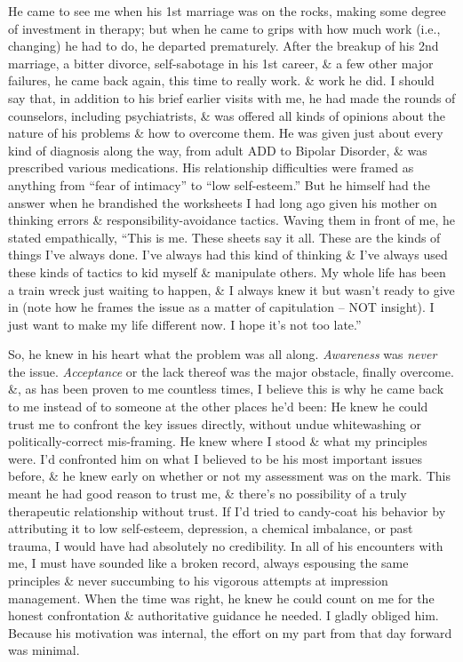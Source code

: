 \documentclass{article}
\numberwithin{equation}{section}
\begin{document}
He came to see me when his 1st marriage was on the rocks, making some degree of investment in therapy; but when he came to grips with how much work (i.e., changing) he had to do, he departed prematurely. After the breakup of his 2nd marriage, a bitter divorce, self-sabotage in his 1st career, \& a few other major failures, he came back again, this time to really work. \& work he did. I should say that, in addition to his brief earlier visits with me, he had made the rounds of counselors, including psychiatrists, \& was offered all kinds of opinions about the nature of his problems \& how to overcome them. He was given just about every kind of diagnosis along the way, from adult ADD to Bipolar Disorder, \& was prescribed various medications. His relationship difficulties were framed as anything from ``fear of intimacy'' to ``low self-esteem.'' But he himself had the answer when he brandished the worksheets I had long ago given his mother on thinking errors \& responsibility-avoidance tactics. Waving them in front of me, he stated empathically, ``This is me. These sheets say it all. These are the kinds of things I've always done. I've always had this kind of thinking \& I've always used these kinds of tactics to kid myself \& manipulate others. My whole life has been a train wreck just waiting to happen, \& I always knew it but wasn't ready to give in (note how he frames the issue as a matter of capitulation -- NOT insight). I just want to make my life different now. I hope it's not too late.''

So, he knew in his heart what the problem was all along. \textit{Awareness} was \textit{never} the issue. \textit{Acceptance} or the lack thereof was the major obstacle, finally overcome. \&, as has been proven to me countless times, I believe this is why he came back to me instead of to someone at the other places he'd been: He knew he could trust me to confront the key issues directly, without undue whitewashing or politically-correct mis-framing. He knew where I stood \& what my principles were. I'd confronted him on what I believed to be his most important issues before, \& he knew early on whether or not my assessment was on the mark. This meant he had good reason to trust me, \& there's no possibility of a truly therapeutic relationship without trust. If I'd tried to candy-coat his behavior by attributing it to low self-esteem, depression, a chemical imbalance, or past trauma, I would have had absolutely no credibility. In all of his encounters with me, I must have sounded like a broken record, always espousing the same principles \& never succumbing to his vigorous attempts at impression management. When the time was right, he knew he could count on me for the honest confrontation \& authoritative guidance he needed. I gladly obliged him. Because his motivation was internal, the effort on my part from that day forward was minimal.
\end{document}
